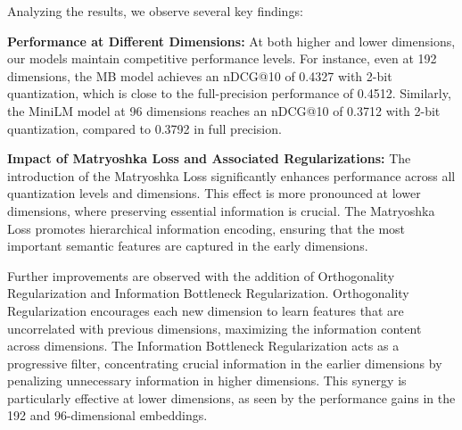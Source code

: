\begin{table}[ht]
\caption{Ablation study for MiniLM model at 96 dimensions.}
\label{tab:minilm_ablation_96}
\centering
{}
\end{table}
Analyzing the results, we observe several key findings:

\textbf{Performance at Different Dimensions:} At both higher and lower dimensions, our models maintain competitive performance levels. For instance, even at 192 dimensions, the MB model achieves an nDCG@10 of 0.4327 with 2-bit quantization, which is close to the full-precision performance of 0.4512. Similarly, the MiniLM model at 96 dimensions reaches an nDCG@10 of 0.3712 with 2-bit quantization, compared to 0.3792 in full precision.

\textbf{Impact of Matryoshka Loss and Associated Regularizations:} The introduction of the Matryoshka Loss significantly enhances performance across all quantization levels and dimensions. This effect is more pronounced at lower dimensions, where preserving essential information is crucial. The Matryoshka Loss promotes hierarchical information encoding, ensuring that the most important semantic features are captured in the early dimensions.

Further improvements are observed with the addition of Orthogonality Regularization and Information Bottleneck Regularization. Orthogonality Regularization encourages each new dimension to learn features that are uncorrelated with previous dimensions, maximizing the information content across dimensions. The Information Bottleneck Regularization acts as a progressive filter, concentrating crucial information in the earlier dimensions by penalizing unnecessary information in higher dimensions. This synergy is particularly effective at lower dimensions, as seen by the performance gains in the 192 and 96-dimensional embeddings.


